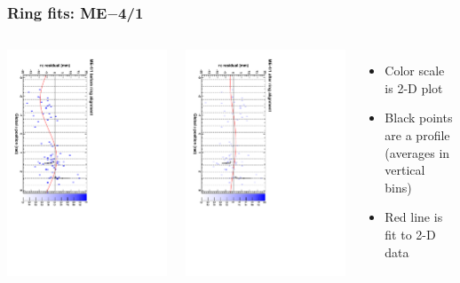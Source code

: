 \documentclass[compress]{beamer}
\begin{document}
\begin{frame}
\frametitle{Ring fits: ME$-$4/1}
\vfill
\begin{columns}
\includegraphics[height=\linewidth, angle=90]{ringfits_before/mem41.pdf}

\includegraphics[height=\linewidth, angle=90]{ringfits_after/mem41.pdf}
\begin{itemize}
\item Color scale is 2-D plot
\item Black points are a profile (averages in vertical bins)
\item Red line is fit to 2-D data
\end{itemize}
\end{columns}
\end{frame}
\end{document}
